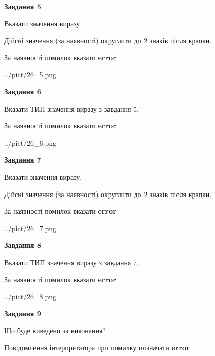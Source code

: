 \documentclass[11pt, ukrainian]{article}
\begin{document}
{\begin {large}
{\begin {center}\textbf{Завдання 5}\end {center}}\par
Вказати значення виразу. \par
Дійсні значення (за наявності) округлити до 2 знаків після крапки. \par
За наявності помилок вказати \textbf{error}

\begin{center}
	{../pict/26_5.png}
\end{center}
\newpage

{\begin {center}\textbf{Завдання 6}\end {center}}\par
Вказати ТИП значення виразу з завдання 5. \par
За наявності помилок вказати \textbf{error}

\begin{center}
	{../pict/26_6.png}
\end{center}
\newpage

{\begin {center}\textbf{Завдання 7}\end {center}}\par
Вказати значення виразу. \par
Дійсні значення (за наявності) округлити до 2 знаків після крапки. \par
За наявності помилок вказати \textbf{error}

\begin{center}
	{../pict/26_7.png}
\end{center}
\newpage

{\begin {center}\textbf{Завдання 8}\end {center}}\par
Вказати ТИП значення виразу з завдання 7. \par
За наявності помилок вказати \textbf{error}

\begin{center}
	{../pict/26_8.png}
\end{center}
\newpage

{\begin {center}\textbf{Завдання 9}\end {center}}\par
Що буде виведено за виконання? \par
Повідомлення інтерпретатора про помилку позначати \textbf{error}


\end{large}}
\end{document}
